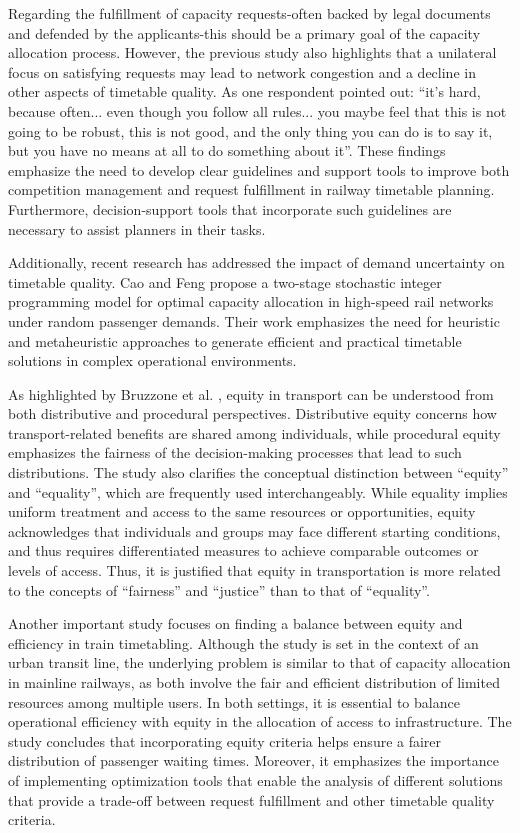 \documentclass[preprint,12pt]{elsarticle}
\begin{document}
Regarding the fulfillment of capacity requests-often backed by legal documents and defended by the applicants-this should be a primary goal of the capacity allocation process. However, the previous study also highlights that a unilateral focus on satisfying requests may lead to network congestion and a decline in other aspects of timetable quality. As one respondent pointed out: ``it’s hard, because often... even though you follow all rules... you maybe feel that this is not going to be robust, this is not good, and the only thing you can do is to say it, but you have no means at all to do something about it''. These findings emphasize the need to develop clear guidelines and support tools to improve both competition management and request fulfillment in railway timetable planning. Furthermore, decision-support tools that incorporate such guidelines are necessary to assist planners in their tasks.

Additionally, recent research has addressed the impact of demand uncertainty on timetable quality. Cao and Feng \cite{Cao2020} propose a two-stage stochastic integer programming model for optimal capacity allocation in high-speed rail networks under random passenger demands. Their work emphasizes the need for heuristic and metaheuristic approaches to generate efficient and practical timetable solutions in complex operational environments.

As highlighted by Bruzzone et al. \cite{Bruzzone2023}, equity in transport can be understood from both distributive and procedural perspectives. Distributive equity concerns how transport-related benefits are shared among individuals, while procedural equity emphasizes the fairness of the decision-making processes that lead to such distributions. The study also clarifies the conceptual distinction between ``equity'' and ``equality'', which are frequently used interchangeably. While equality implies uniform treatment and access to the same resources or opportunities, equity acknowledges that individuals and groups may face different starting conditions, and thus requires differentiated measures to achieve comparable outcomes or levels of access. Thus, it is justified that equity in transportation is more related to the concepts of ``fairness'' and ``justice'' than to that of ``equality''.

Another important study \cite{Zhang2019} focuses on finding a balance between equity and efficiency in train timetabling. Although the study is set in the context of an urban transit line, the underlying problem is similar to that of capacity allocation in mainline railways, as both involve the fair and efficient distribution of limited resources among multiple users. In both settings, it is essential to balance operational efficiency with equity in the allocation of access to infrastructure. The study concludes that incorporating equity criteria helps ensure a fairer distribution of passenger waiting times. Moreover, it emphasizes the importance of implementing optimization tools that enable the analysis of different solutions that provide a trade-off between request fulfillment and other timetable quality criteria.
\end{document}
